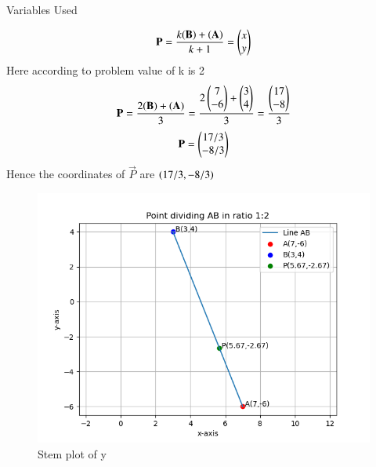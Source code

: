 \documentclass[journal]{IEEEtran}
\begin{document}
\begin{table}[h!]    
  \centering
  
  \caption{Variables Used}
  \label{tab10.5.3.9.1}
\end{table}
\begin{align}
\mathbf{P}=\frac{k(\mathbf{B})+(\mathbf{A})}{k+1}=\begin{pmatrix}x\\y\end{pmatrix}\\
\end{align}
Here according to problem value of k is 2\\
\begin{align}
\mathbf{P}=\frac{2(\mathbf{B})+(\mathbf{A})}{3}=\frac{2\begin{pmatrix}7\\-6\end{pmatrix}+\begin{pmatrix}3\\4\end{pmatrix}}{3}=\frac{\begin{pmatrix}17\\-8\end{pmatrix}}{3}\\
\end{align}
\begin{align}
\mathbf{P}=\begin{pmatrix}17/3\\-8/3\end{pmatrix}
\end{align}
Hence the coordinates of $\vec{P}$ are $\left(17/3,-8/3\right)$
\begin{figure}
    \centering
    \includegraphics[width=0.7\linewidth]{figs/plot.png}
    \caption{Stem plot of y}
    \label{stemplot}
\end{figure}
\end{document}
